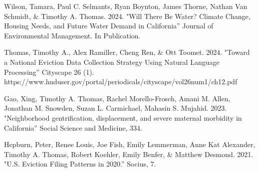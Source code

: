 



\begin{cvparagraph}

Wilson, Tamara, Paul C. Selmants, Ryan Boynton, James Thorne, Nathan Van Schmidt, \& Timothy A. Thomas. 2024. "Will There Be Water? Climate Change, Housing Needs, and Future Water Demand in California” Journal of Environmental Management. In Publication.
\end{cvparagraph}

\begin{cvparagraph}

Thomas, Timothy A., Alex Ramiller, Cheng Ren, \& Ott Toomet. 2024. "Toward a National Eviction Data Collection Strategy Using Natural Language Processing” Cityscape 26 (1). https://www.huduser.gov/portal/periodicals/cityscape/vol26num1/ch12.pdf
\end{cvparagraph}

\begin{cvparagraph}

Gao, Xing, Timothy A. Thomas, Rachel Morello-Frosch, Amani M. Allen, Jonathan M. Snowden, Suzan L. Carmichael, Mahasin S. Mujahid.  
2023. "Neighborhood gentrification, displacement, and severe maternal morbidity in California” Social Science and Medicine, 334.
\end{cvparagraph}

\begin{cvparagraph}

Hepburn, Peter, Renee Louis, Joe Fish, Emily Lemmerman, Anne Kat Alexander,  Timothy A. Thomas, Robert Koehler, Emily Benfer, \& Matthew Desmond. 2021. "U.S. Eviction Filing Patterns in 2020.” Socius, 7.
\end{cvparagraph}

